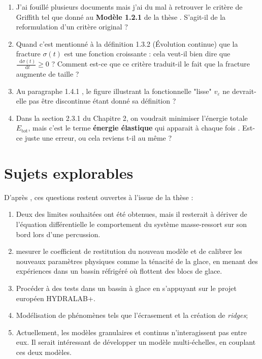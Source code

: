 \documentclass[
  french,
	11pt, %
]{fphw}
\newcommand*\diff{\mathop{}\!\mathrm{d}}
\begin{document}
\begin{enumerate}
  \item J'ai fouillé plusieurs documents mais j'ai du mal à retrouver le critère de Griffith tel que donné au \textbf{Modèle 1.2.1} de la thèse \parencite[p.32]{balasoiu2020thesis}. S'agit-il de la reformulation d'un critère original ?
  \item Quand c'est mentionné à la définition 1.3.2 (Évolution continue) \parencite[p.37]{balasoiu2020thesis} que la fracture $\sigma(t)$ est une fonction croissante : cela veut-il bien dire que $\frac{\diff{\sigma (t)}}{\diff{t}} \geq 0$ ? Comment est-ce que ce critère traduit-il le fait que la fracture augmente de taille ?
  \item Au paragraphe 1.4.1 \parencite[p.37]{balasoiu2020thesis}, le figure illustrant la fonctionnelle "lisse" $v_{\varepsilon}$ ne devrait-elle pas être discontinue étant donné sa définition ?
  \item Dans la section 2.3.1 du Chapitre 2, on voudrait minimiser l'énergie totale $E_{\text{tot}}$, mais c'est le terme \textbf{énergie élastique} qui apparait à chaque fois \parencite[p.49]{balasoiu2020thesis}. Est-ce juste une erreur, ou cela reviens t-il au même ?
\end{enumerate}


\section{Sujets explorables}

D'après \parencite{balasoiu2020thesis}, ces questions restent ouvertes à l'issue de la thèse :
\begin{enumerate}
  \item Deux des limites souhaitées ont été obtenues, mais il resterait à dériver de l’équation différentielle le comportement du système masse-ressort sur son bord lors d’une percussion.
  \item mesurer le coefficient de restitution du nouveau modèle et de calibrer les nouveaux paramètres physiques comme
  la ténacité de la glace, en menant des expériences dans un bassin réfrigéré où flottent des blocs de glace.
  \item Procéder à des tests dans un bassin à glace en s’appuyant sur le projet européen HYDRALAB+.
  \item Modélisation de phénomènes tels que l’écrasement et la création de \textit{ridges};
  \item Actuellement, les modèles granulaires et continus n’interagissent pas
  entre eux. Il serait intéressant de développer un modèle multi-échelles, en couplant ces deux modèles.
  
\end{enumerate}

\clearpage   %
\printbibliography
\end{document}
